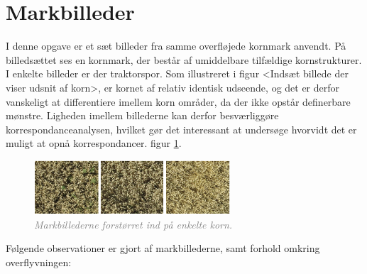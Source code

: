 \section{Markbilleder}
I denne opgave er et sæt billeder fra samme overfløjede kornmark anvendt. På billedsættet ses en kornmark, der består af umiddelbare tilfældige kornstrukturer. I enkelte billeder er der traktorspor. Som illustreret i figur <Indsæt billede der viser udsnit af korn>, er kornet af relativ identisk udseende, og det er derfor vanskeligt at differentiere imellem korn områder, da der ikke opstår definerbare mønstre. Ligheden imellem billederne kan derfor besværliggøre korrespondanceanalysen, hvilket gør det interessant at undersøge hvorvidt det er muligt at opnå korrespondancer.
 figur \ref{fig:korn}.
\begin{figure}[H]
    \centering
    \includegraphics[width=0.65\textwidth]{fig/20.png}
    \begin{center}    
       \caption{\textcolor{gray}{\footnotesize \textit{Markbillederne forstørret ind på enkelte korn.}}}
    \label{fig:korn}
     \end{center}
     \vspace{-2.5em}
  \end{figure} \noindent
Følgende observationer er gjort af markbillederne, samt forhold omkring overflyvningen:
